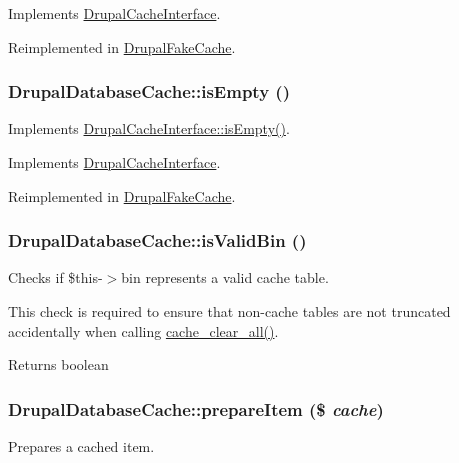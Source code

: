 Implements \hyperlink{interfaceDrupalCacheInterface_aee8c869921fff61654d12099237763dc}{DrupalCacheInterface}.

Reimplemented in \hyperlink{classDrupalFakeCache_a9ca8ecb251e83f3d30beb2f6722ef746}{DrupalFakeCache}.\hypertarget{classDrupalDatabaseCache_addc129b38e3ffdda5a55f2f453ea5619}{
\subsubsection[{isEmpty}]{\setlength{\rightskip}{0pt plus 5cm}DrupalDatabaseCache::isEmpty ()}}
\label{classDrupalDatabaseCache_addc129b38e3ffdda5a55f2f453ea5619}
Implements \hyperlink{interfaceDrupalCacheInterface_a54fa3e2f8e11cbb551d5168c9f22c720}{DrupalCacheInterface::isEmpty()}. 

Implements \hyperlink{interfaceDrupalCacheInterface_a54fa3e2f8e11cbb551d5168c9f22c720}{DrupalCacheInterface}.

Reimplemented in \hyperlink{classDrupalFakeCache_a78bf2c373a0204a24bd809c0f27e7a4e}{DrupalFakeCache}.\hypertarget{classDrupalDatabaseCache_a3d9f8274f05d6c23515a15bad5e997a4}{
\subsubsection[{isValidBin}]{\setlength{\rightskip}{0pt plus 5cm}DrupalDatabaseCache::isValidBin ()}}
\label{classDrupalDatabaseCache_a3d9f8274f05d6c23515a15bad5e997a4}
Checks if \$this-\/$>$bin represents a valid cache table.

This check is required to ensure that non-\/cache tables are not truncated accidentally when calling \hyperlink{includes_2cache_8inc_a409b34dd629640d791a11736a9de8125}{cache\_\-clear\_\-all()}.

\begin{DoxyReturn}{Returns}
boolean 
\end{DoxyReturn}
\hypertarget{classDrupalDatabaseCache_a63148b862b8b39426c50f45e1c7fe43d}{
\subsubsection[{prepareItem}]{\setlength{\rightskip}{0pt plus 5cm}DrupalDatabaseCache::prepareItem (\$ {\em cache})}}
\label{classDrupalDatabaseCache_a63148b862b8b39426c50f45e1c7fe43d}
Prepares a cached item.


